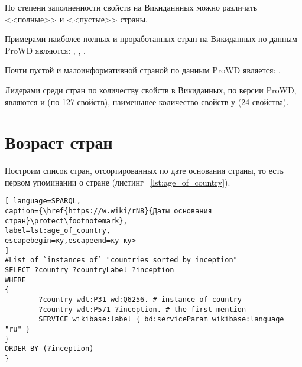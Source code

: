 По степени заполненности свойств на Викиданнных можно различать <<полные>> и  <<пустые>> страны. 

Примерами наиболее полных и проработанных стран на Викиданных по данным ProWD\cite{prowd_balakireva} являются: , , .

Почти пустой и малоинформативной страной по данным ProWD является: .

Лидерами среди стран по количеству свойств в Викиданных, по версии ProWD, являются  и  (по 127 свойств), наименьшее количество свойств у  (24 свойства).

\section{Возраст стран}


Построим список стран, отсортированных по дате основания страны, то есть первом упоминании о стране (листинг ~\ref{lst:age_of_country}).

\begin{lstlisting}[ language=SPARQL, 
caption={\href{https://w.wiki/rN8}{Даты основания стран}\protect\footnotemark},
label=lst:age_of_country, 
escapebegin=ку,escapeend=ку-ку>
]
#List of `instances of` "countries sorted by inception" 
SELECT ?country ?countryLabel ?inception
WHERE
{
		?country wdt:P31 wd:Q6256. # instance of country
		?country wdt:P571 ?inception. # the first mention	
		SERVICE wikibase:label { bd:serviceParam wikibase:language "ru" }
}
ORDER BY (?inception)
}
\end{lstlisting}

